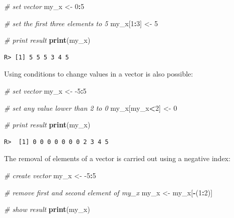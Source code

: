 \documentclass[
  12pt,
]{book}
\newenvironment{Shaded}{\begin{snugshade}}{\end{snugshade}}
\newcommand{\CommentTok}[1]{\textcolor[rgb]{0.37,0.37,0.37}{\textit{#1}}}
\newcommand{\DecValTok}[1]{\textcolor[rgb]{0.06,0.06,0.06}{#1}}
\newcommand{\KeywordTok}[1]{\textcolor[rgb]{0.27,0.27,0.27}{\textbf{#1}}}
\newcommand{\NormalTok}[1]{#1}
\newcommand{\OperatorTok}[1]{\textcolor[rgb]{0.43,0.43,0.43}{\textbf{#1}}}
\newcommand{\StringTok}[1]{\textcolor[rgb]{0.5,0.5,0.5}{#1}}
\begin{document}
\begin{Shaded}
\begin{Highlighting}[]
\CommentTok{# set vector}
\NormalTok{my_x <-}\StringTok{ }\DecValTok{0}\OperatorTok{:}\DecValTok{5}

\CommentTok{# set the first three elements to 5}
\NormalTok{my_x[}\DecValTok{1}\OperatorTok{:}\DecValTok{3}\NormalTok{] <-}\StringTok{ }\DecValTok{5}

\CommentTok{# print result}
\KeywordTok{print}\NormalTok{(my_x)}
\end{Highlighting}
\end{Shaded}

\begin{verbatim}
R> [1] 5 5 5 3 4 5
\end{verbatim}

Using conditions to change values in a vector is also possible:

\begin{Shaded}
\begin{Highlighting}[]
\CommentTok{# set vector}
\NormalTok{my_x <-}\StringTok{ }\DecValTok{-5}\OperatorTok{:}\DecValTok{5}

\CommentTok{# set any value lower than 2 to 0}
\NormalTok{my_x[my_x}\OperatorTok{<}\DecValTok{2}\NormalTok{] <-}\StringTok{ }\DecValTok{0}

\CommentTok{# print result}
\KeywordTok{print}\NormalTok{(my_x)}
\end{Highlighting}
\end{Shaded}

\begin{verbatim}
R>  [1] 0 0 0 0 0 0 0 2 3 4 5
\end{verbatim}

The removal of elements of a vector is carried out using a negative index:

\begin{Shaded}
\begin{Highlighting}[]
\CommentTok{# create vector}
\NormalTok{my_x <-}\StringTok{ }\DecValTok{-5}\OperatorTok{:}\DecValTok{5}

\CommentTok{# remove first and second element of my_x}
\NormalTok{my_x <-}\StringTok{ }\NormalTok{my_x[}\OperatorTok{-}\NormalTok{(}\DecValTok{1}\OperatorTok{:}\DecValTok{2}\NormalTok{)]}

\CommentTok{# show result}
\KeywordTok{print}\NormalTok{(my_x)}
\end{Highlighting}
\end{Shaded}
\end{document}
